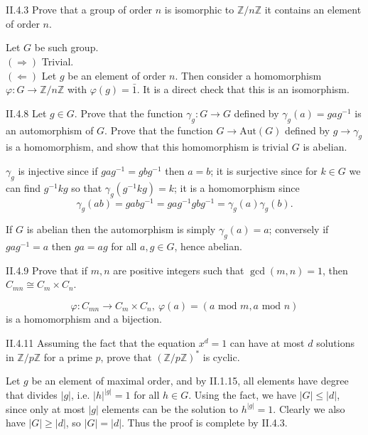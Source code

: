 \section{}

\begin{problem}{II.4.3}
Prove that a group of order $n$ is isomorphic to $\mathbb{Z}/n\mathbb{Z}$ \iffw it contains an element of order $n$.
\end{problem}
\begin{pf}
Let $G$ be such group. \\
$(\Rightarrow)$ Trivial. \\
$(\Leftarrow)$ Let $g$ be an element of order $n$. Then consider a homomorphism $\varphi: G \to \mathbb{Z}/n\mathbb{Z}$ with $\varphi(g) = \bar{1}$. It is a direct check that this is an isomorphism.
\end{pf}

\begin{problem}{II.4.8}
Let $g \in G$. Prove that the function $\gamma_g:G \to G$ defined by $\gamma_g(a)=gag^{-1}$ is an automorphism of $G$. Prove that the function $G \to \text{Aut}(G)$ defined by $g \to \gamma_g$ is a homomorphism, and show that this homomorphism is trivial \iffw $G$ is abelian.
\end{problem}
\begin{pf}
$\gamma_g$ is injective since if $gag^{-1} = gbg^{-1}$ then $a = b$; it is surjective since for $k \in G$ we can find $g^{-1}kg$ so that $\gamma_g(g^{-1}kg) = k$; it is a homomorphism since \[\gamma_g(ab) = gabg^{-1} = gag^{-1}gbg^{-1} = \gamma_g(a)\gamma_g(b).\]

If $G$ is abelian then the automorphism is simply $\gamma_g(a)=a$; conversely if $gag^{-1} = a$ then $ga = ag$ for all $a, g \in G$, hence abelian.
\end{pf}

\begin{problem}{II.4.9}
Prove that if $m, n$ are positive integers such that $\gcd(m,n) = 1$, then $C_{mn} \cong C_m \times C_n$.
\end{problem}
\begin{pf}
\[
\varphi:C_{mn} \to C_m \times C_n ,\: \varphi(a) = (a \text{ mod } m, a \text{ mod } n)
\]
is a homomorphism and a bijection.
\end{pf}

\begin{problem}{II.4.11}
Assuming the fact that the equation $x^d = 1$ can have at most $d$ solutions in $\mathbb{Z}/p\mathbb{Z}$ for a prime $p$, prove that $(\mathbb{Z}/p\mathbb{Z})^*$ is cyclic.
\end{problem}
\begin{pf}
Let $g$ be an element of maximal order, and by II.1.15, all elements have degree that divides $|g|$, i.e. $|h|^{|g|} = 1$ for all $h \in G$. Using the fact, we have $|G| \leq |d|$, since only at most $|g|$ elements can be the solution to $h^{|g|} = 1$. Clearly we also have $|G| \geq |d|$, so $|G| = |d|$. Thus the proof is complete by II.4.3.
\end{pf}

